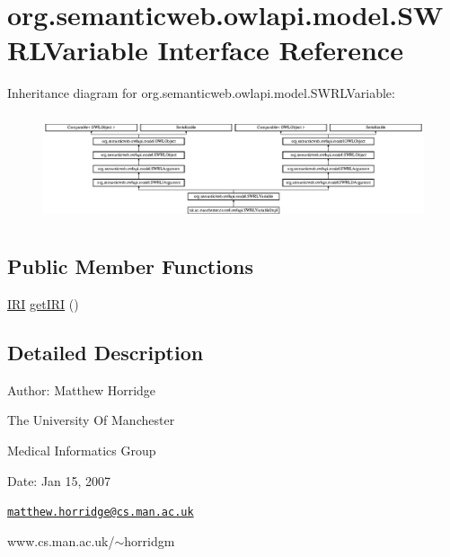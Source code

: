 \hypertarget{interfaceorg_1_1semanticweb_1_1owlapi_1_1model_1_1_s_w_r_l_variable}{\section{org.\-semanticweb.\-owlapi.\-model.\-S\-W\-R\-L\-Variable Interface Reference}
\label{interfaceorg_1_1semanticweb_1_1owlapi_1_1model_1_1_s_w_r_l_variable}
}
Inheritance diagram for org.\-semanticweb.\-owlapi.\-model.\-S\-W\-R\-L\-Variable\-:\begin{figure}[H]
\begin{center}
\leavevmode
\includegraphics[height=3.181818cm]{interfaceorg_1_1semanticweb_1_1owlapi_1_1model_1_1_s_w_r_l_variable}
\end{center}
\end{figure}
\subsection*{Public Member Functions}
\begin{DoxyCompactItemize}
\item 
\hyperlink{classorg_1_1semanticweb_1_1owlapi_1_1model_1_1_i_r_i}{I\-R\-I} \hyperlink{interfaceorg_1_1semanticweb_1_1owlapi_1_1model_1_1_s_w_r_l_variable_a8e43e47007c91d300315806d8784ee9d}{get\-I\-R\-I} ()
\end{DoxyCompactItemize}


\subsection{Detailed Description}
Author\-: Matthew Horridge\par
 The University Of Manchester\par
 Medical Informatics Group\par
 Date\-: Jan 15, 2007\par
\par
 

\href{mailto:matthew.horridge@cs.man.ac.uk}{\tt matthew.\-horridge@cs.\-man.\-ac.\-uk}\par
 www.\-cs.\-man.\-ac.\-uk/$\sim$horridgm\par
\par


